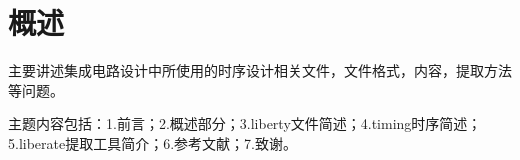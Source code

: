 \section{概述}
主要讲述集成电路设计中所使用的时序设计相关文件，文件格式，内容，提取方法等问题。

主题内容包括：1.前言；2.概述部分；3.liberty文件简述；4.timing时序简述；5.liberate提取工具简介；6.参考文献；7.致谢。
